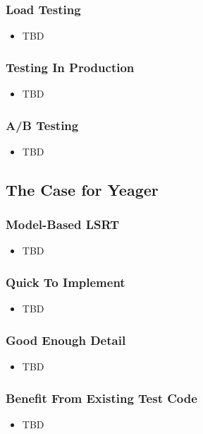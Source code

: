 \begin{frame}
  \frametitle{Load Testing}
  \begin{itemize}
    \item TBD
  \end{itemize}
\end{frame}

\begin{frame}
  \frametitle{Testing In Production}
  \begin{itemize}
    \item TBD
  \end{itemize}
\end{frame}

\begin{frame}
  \frametitle{A/B Testing}
  \begin{itemize}
    \item TBD
  \end{itemize}\cite{HBR2017ABTest}
\end{frame}

\subsection{The Case for Yeager}

\begin{frame}
  \frametitle{Model-Based LSRT}
  \begin{itemize}
    \item TBD
  \end{itemize}
\end{frame}

\begin{frame}
  \frametitle{Quick To Implement}
  \begin{itemize}
    \item TBD
  \end{itemize}
\end{frame}

\begin{frame}
  \frametitle{Good Enough Detail}
  \begin{itemize}
    \item TBD
  \end{itemize}
\end{frame}

\begin{frame}
  \frametitle{Benefit From Existing Test Code}
  \begin{itemize}
    \item TBD
  \end{itemize}
\end{frame}
